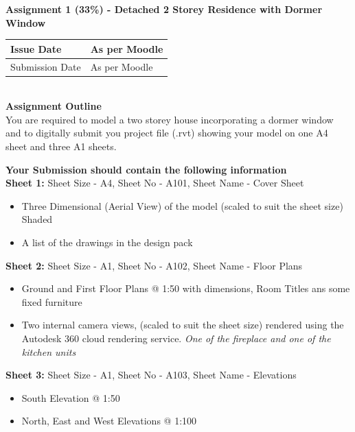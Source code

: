 
	
\begin{flushleft}
\Large\textbf{Assignment 1 (33\%) - Detached 2 Storey Residence with Dormer Window}\\
\end{flushleft}

\begin{tabular}{|l|l|}
	\hline 
	Issue Date & As per Moodle \\ 
	\hline 
	Submission Date & As per Moodle \\ 
	\hline 
\end{tabular} 
\\

\large\textbf{Assignment Outline}\\

You are required to model a two storey house incorporating a dormer window and to digitally submit you project file (.rvt) showing your model on one A4 sheet and three A1 sheets.

\large\textbf{Your Submission should contain the following information}\\


\textbf{Sheet 1:} Sheet Size - A4, Sheet No - A101, Sheet Name - Cover Sheet
\begin{itemize}
	\item Three Dimensional (Aerial View) of the model (scaled to suit the sheet size) Shaded
	\item A list of the drawings in the design pack
\end{itemize}


\textbf{Sheet 2:} Sheet Size - A1, Sheet No - A102, Sheet Name - Floor Plans
\begin{itemize}
	\item Ground and First Floor Plans @ 1:50 with dimensions, Room Titles ans some fixed furniture
	\item Two internal camera views, (scaled to suit the sheet size) rendered using the Autodesk 360 cloud rendering service.  \textit{One of the fireplace and one of the kitchen units} 
\end{itemize}


\textbf{Sheet 3:} Sheet Size - A1, Sheet No - A103, Sheet Name - Elevations
\begin{itemize}
	\item South Elevation @ 1:50
	\item North, East and West Elevations @ 1:100
\end{itemize}

